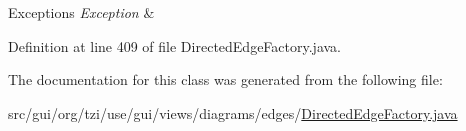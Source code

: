\begin{DoxyExceptions}{Exceptions}
{\em Exception} & \\
\hline
\end{DoxyExceptions}


Definition at line 409 of file Directed\-Edge\-Factory.\-java.



The documentation for this class was generated from the following file\-:\begin{DoxyCompactItemize}
\item 
src/gui/org/tzi/use/gui/views/diagrams/edges/\hyperlink{_directed_edge_factory_8java}{Directed\-Edge\-Factory.\-java}\end{DoxyCompactItemize}
